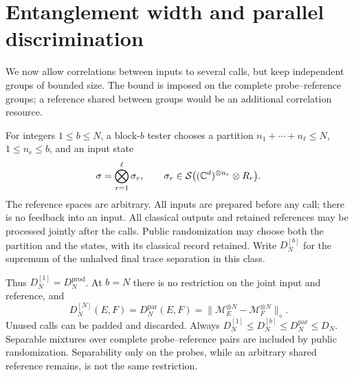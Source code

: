 \section{Entanglement width and parallel discrimination}
\label{sec:width87}
We now allow correlations between inputs to several calls, but keep
independent groups of bounded size.  The bound is imposed on the
complete probe--reference groups; a reference shared between groups
would be an additional correlation resource.

\begin{definition}\label{def:blocks87}
For integers $1\le b\le N$, a block-$b$ tester chooses a partition
$n_1+\cdots+n_\ell\le N$, $1\le n_r\le b$, and an input state
\[
 \sigma=\bigotimes_{r=1}^{\ell}\sigma_r,
 \qquad
 \sigma_r\in\mathcal S\bigl((\mathbb C^d)^{\otimes n_r}\otimes R_r\bigr).
\]
The reference spaces are arbitrary.  All inputs are prepared before
any call; there is no feedback into an input.  All classical outputs
and retained references may be processed jointly after the calls.
Public randomization may choose both the partition and the states,
with its classical record retained.  Write $D_N^{[b]}$ for the
supremum of the unhalved final trace separation in this class.
\end{definition}

Thus $D_N^{[1]}=D_N^{\mathrm{prod}}$.  At $b=N$ there is no
restriction on the joint input and reference, and
\begin{equation}\label{eq:parallelidentity87}
 D_N^{[N]}(E,F)=D_N^{\mathrm{par}}(E,F)
 =\|\mathcal M_E^{\otimes N}-\mathcal M_F^{\otimes N}\|_\diamond.
\end{equation}
Unused calls can be padded and discarded.  Always
$D_N^{[1]}\le D_N^{[b]}\le D_N^{\mathrm{par}}\le D_N$.
Separable mixtures over complete probe--reference pairs are included
by public randomization.  Separability only on the probes, while an
arbitrary shared reference remains, is not the same restriction.


